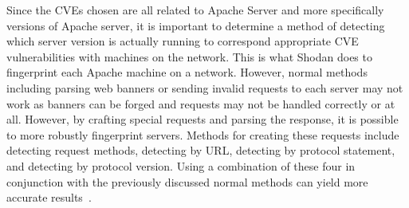 Since the CVEs chosen are all related to Apache Server and more specifically versions of Apache server, it is important to determine a method of detecting which server version is actually running to correspond appropriate CVE vulnerabilities with machines on the network. This is what Shodan does to fingerprint each Apache machine on a network. However, normal methods including parsing web banners or sending invalid requests to each server may not work as banners can be forged and requests may not be handled correctly or at all. However, by crafting special requests and parsing the response, it is possible to more robustly fingerprint servers. Methods for creating these requests include detecting request methods, detecting by URL, detecting by protocol statement, and detecting by protocol version. Using a combination of these four in conjunction with the previously discussed normal methods can yield more accurate results~\cite{jiao_wu_2007}.